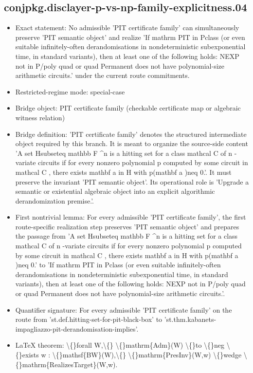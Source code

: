 \documentclass[11pt]{article}
\begin{document}
\subsection*{conjpkg.disclayer-p-vs-np-family-explicitness.04}
\begin{itemize}
\item Exact statement: No admissible 'PIT certificate family' can simultaneously preserve 'PIT semantic object' and realize 'If mathrm PIT in Pclass (or even suitable infinitely-often derandomisations in nondeterministic subexponential time, in standard variants), then at least one of the following holds: NEXP not in P/poly quad or quad Permanent does not have polynomial-size arithmetic circuits.' under the current route commitments.
\item Restricted-regime mode: special-case
\item Bridge object: PIT certificate family (checkable certificate map or algebraic witness relation)
\item Bridge definition: 'PIT certificate family' denotes the structured intermediate object required by this branch. It is meant to organize the source-side content 'A set Hsubseteq mathbb F \textasciicircum{}n is a hitting set for a class mathcal C of n -variate circuits if for every nonzero polynomial p computed by some circuit in mathcal C , there exists mathbf a in H with p(mathbf a )neq 0.'. It must preserve the invariant 'PIT semantic object'. Its operational role is 'Upgrade a semantic or existential algebraic object into an explicit algorithmic derandomization premise.'.
\item First nontrivial lemma: For every admissible 'PIT certificate family', the first route-specific realization step preserves 'PIT semantic object' and prepares the passage from 'A set Hsubseteq mathbb F \textasciicircum{}n is a hitting set for a class mathcal C of n -variate circuits if for every nonzero polynomial p computed by some circuit in mathcal C , there exists mathbf a in H with p(mathbf a )neq 0.' to 'If mathrm PIT in Pclass (or even suitable infinitely-often derandomisations in nondeterministic subexponential time, in standard variants), then at least one of the following holds: NEXP not in P/poly quad or quad Permanent does not have polynomial-size arithmetic circuits.'.
\item Quantifier signature: For every admissible 'PIT certificate family' on the route from 'st.def.hitting-set-for-pit-black-box' to 'st.thm.kabanets-impagliazzo-pit-derandomisation-implies'.
\item LaTeX theorem: \textbackslash\{\}forall W,\textbackslash\{\} \textbackslash\{\}mathrm\{Adm\}(W) \textbackslash\{\}to \textbackslash\{\}neg \textbackslash\{\}exists w : \textbackslash\{\}mathsf\{BW\}(W),\textbackslash\{\} \textbackslash\{\}mathrm\{PresInv\}(W,w) \textbackslash\{\}wedge \textbackslash\{\}mathrm\{RealizesTarget\}(W,w).

\end{itemize}
\end{document}
